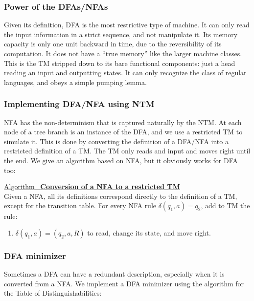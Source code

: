 \documentclass[12pt]{article}  %
\newcommand{\algtitle}[1]{\underline{Algorithm \ {\bf #1}} \vspace*{1mm}\\}
\begin{document}
\subsubsection{Power of the DFAs/NFAs}

Given its definition, DFA is the most restrictive type of machine. It can only read the input information in a strict sequence, and not manipulate it. Its memory capacity is only one unit backward in time, due to the reversibility of its computation. It does not have a ``true memory'' like the larger machine classes. This is the TM stripped down to its bare functional components: just a head reading an input and outputting states. It can only recognize the class of regular languages, and obeys a simple pumping lemma.


\subsubsection{Implementing DFA/NFA using NTM}
NFA has the non-determinism that is captured naturally by the NTM. At each node of a tree branch is an instance of the DFA, and we use a restricted TM to simulate it. This is done by converting the definition of a DFA/NFA into a restricted definition of a TM. The TM only reads and input and moves right until the end. We give an algorithm based on NFA, but it obviously works for DFA too:

\algtitle{Conversion of a NFA to a restricted TM}
Given a NFA, all its definitions correspond directly to the definition of a TM, except for the transition table. For every NFA rule $\delta(q_1, a) = q_2$, add to TM the rule:
\begin{enumerate}
	\item $\delta(q_1, a) = (q_2, a, R)$ to read, change its state, and move right.
\end{enumerate}



\subsubsection{DFA minimizer}
Sometimes a DFA can have a redundant description, especially when it is converted from a NFA. We implement a DFA minimizer using the algorithm for the Table of Distinguishabilities:
\end{document}

